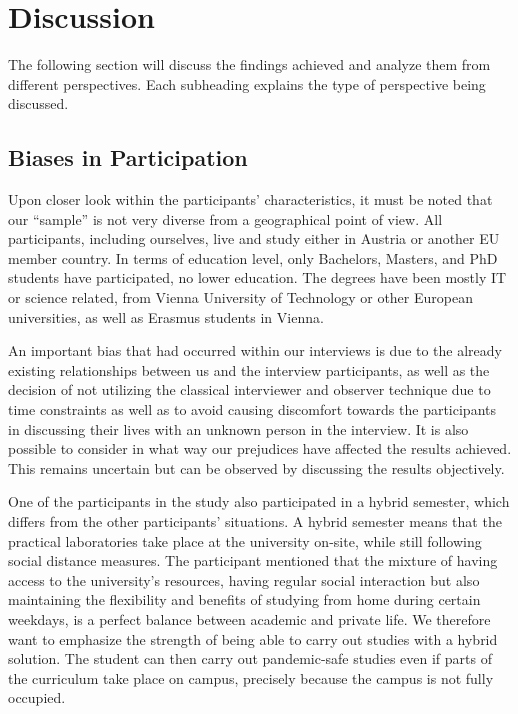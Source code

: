 \documentclass{sigchi}
\begin{document}
\section{Discussion}

The following section will discuss the findings achieved and analyze them from different perspectives. Each subheading explains the type of perspective being discussed.

\subsection{Biases in Participation}

Upon closer look within the participants' characteristics, it must be noted that our “sample” is not very diverse from a geographical point of view. All participants, including ourselves, live and study either in Austria or another EU member country. In terms of education level, only Bachelors, Masters, and PhD students have participated, no lower education. The degrees have been mostly IT or science related, from Vienna University of Technology or other European universities, as well as Erasmus students in Vienna.

An important bias that had occurred within our interviews is due to the already existing relationships between us and the interview participants, as well as the decision of not utilizing the classical interviewer and observer technique due to time constraints as well as to avoid causing discomfort towards the participants in discussing their lives with an unknown person in the interview. It is also possible to consider in what way our prejudices have affected the results achieved. This remains uncertain but can be observed by discussing the results objectively. 

One of the participants in the study also participated in a hybrid semester, which differs from the other participants' situations. A hybrid semester means that the practical laboratories take place at the university on-site, while still following social distance measures. The participant mentioned that the mixture of having access to the university's resources, having regular social interaction but also maintaining the flexibility and benefits of studying from home during certain weekdays, is a perfect balance between academic and private life. We therefore want to emphasize the strength of being able to carry out studies with a hybrid solution. The student can then carry out pandemic-safe studies even if parts of the curriculum take place on campus, precisely because the campus is not fully occupied.
\end{document}

